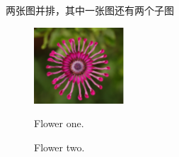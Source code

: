 \documentclass{article}
\begin{document}
\begin{CJK}{UTF8}{gbsn}
两张图并排，其中一张图还有两个子图
\begin{figure}[!tbp]
	\setlength{\abovecaptionskip}{0pt}
	\setlength{\belowcaptionskip}{0pt}
	\centering
	\begin{minipage}[b]{0.4\textwidth}
		\includegraphics[width=\textwidth]{imgs/flower1.png}
		\caption{Flower one.}
	\end{minipage}
	\hfill
	\begin{minipage}[b]{0.55\textwidth}
		\caption{Flower two.}
	\end{minipage}
\end{figure}


\end{CJK}
\end{document}
